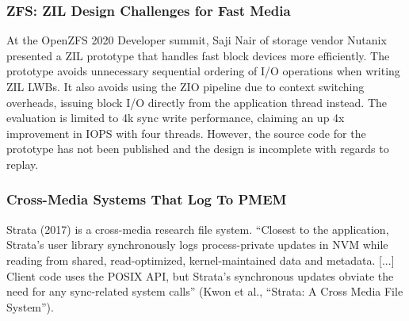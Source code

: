 \documentclass[12pt,a4paper,twoside,draft]{book}
\begin{document}
\subsubsection{ZFS: ZIL Design Challenges for Fast Media}
At the OpenZFS 2020 Developer summit, Saji Nair of storage vendor Nutanix presented a ZIL prototype that handles fast block devices more efficiently.
The prototype avoids unnecessary sequential ordering of I/O operations when writing ZIL LWBs.
It also avoids using the ZIO pipeline due to context switching overheads, issuing block I/O directly from the application thread instead.
The evaluation is limited to 4k sync write performance, claiming an up 4x improvement in IOPS with four threads.
However, the source code for the prototype has not been published and the design is incomplete with regards to replay.

\subsubsection{Cross-Media Systems That Log To PMEM}

Strata (2017) is a cross-media research file system.
  “Closest to the application, Strata’s user library synchronously logs process-private updates in NVM while reading from shared, read-optimized, kernel-maintained data and metadata.
  [...]
  Client code uses the POSIX API, but Strata’s synchronous updates obviate the need for any sync-related system calls”
  (Kwon et al., “Strata: A Cross Media File System”).
\end{document}
